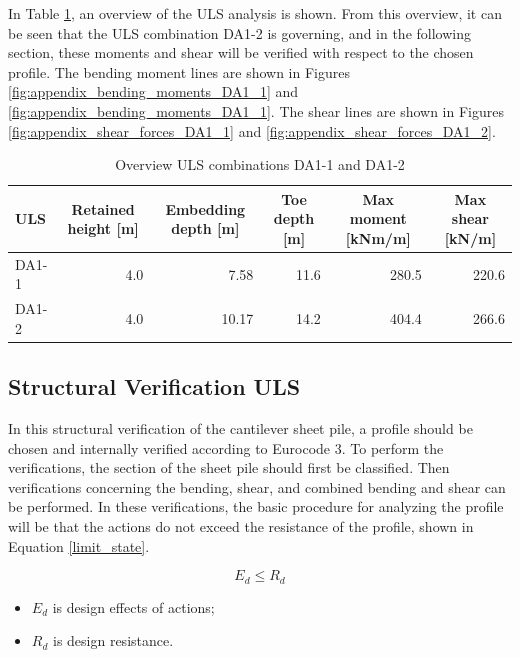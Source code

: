 In Table \ref{tab:uls_summary}, an overview of the ULS analysis is shown. From this overview, it can be seen that the ULS combination DA1-2 is governing, and in the following section, these moments and shear will be verified with respect to the chosen profile. The bending moment lines are shown in Figures \ref{fig:appendix_bending_moments_DA1_1} and \ref{fig:appendix_bending_moments_DA1_1}. The shear lines are shown in Figures \ref{fig:appendix_shear_forces_DA1_1} and \ref{fig:appendix_shear_forces_DA1_2}.

\begin{table}[H]
  \centering
  \caption{Overview ULS combinations DA1-1 and DA1-2}
  \label{tab:uls_summary}
  \small
  \setlength{\tabcolsep}{8pt}
  \renewcommand{\arraystretch}{1.15}
  \begin{tabular}{@{}l r r r r r@{}}
    \toprule
    ULS & \multicolumn{1}{c}{Retained height [m]} & \multicolumn{1}{c}{Embedding depth [m]} & \multicolumn{1}{c}{Toe depth [m]} & \multicolumn{1}{c}{Max moment [kNm/m]} & \multicolumn{1}{c}{Max shear [kN/m]} \\
    \midrule
    DA1-1   & 4.0 & 7.58 & 11.6 & 280.5 & 220.6 \\
    DA1-2  & 4.0 & 10.17 & 14.2 & 404.4 & 266.6 \\
    \bottomrule
  \end{tabular}
\end{table}

\newpage

\subsection{Structural Verification ULS}
\label{section:structural_verification_uls}

In this structural verification of the cantilever sheet pile, a profile should be chosen and internally verified according to Eurocode 3. To perform the verifications, the section of the sheet pile should first be classified. Then verifications concerning the bending, shear, and combined bending and shear can be performed. In these verifications, the basic procedure for analyzing the profile will be that the actions do not exceed the resistance of the profile, shown in Equation \ref{limit_state}.

\begin{equation}
    E_{d} \leq R_{d}
    \label{limit_state}
\end{equation}

\begin{itemize}
    \item $E_{d}$ is design effects of actions;
    \item $R_{d}$ is design resistance.
\end{itemize}

